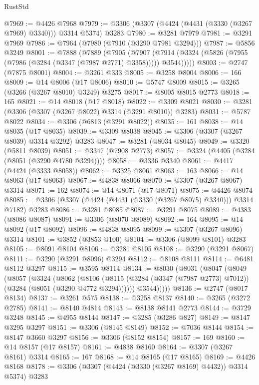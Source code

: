 \begin{lexlean}{RustStd}
\begin{coremodule}
@7969 := @4426 @7968
@7979 := @3306 (@3307 (@4424 (@4431 (@3330 (@3267 @7969) @3340))) @3314 @5374) @3283
@7980 := @3281 @7979
@7981 := @3291 @7969
@7986 := @7964 (@7980 (@7910 (@3290 @7981 @3294)))
@7987 := @5856 @3249
@8001 := @7888
    (@7889
      (@7905
        (@7907 (@7914 (@3324 (@5826 (@7955 (@7986 (@3284 (@3347 (@7987 @2771) @3358))))) @3544)))))
@8003 := @2747 (@7875 @8001)
@8004 := @3261 @333
@8005 := @3258 @8004
@8006 := 166
@8009 := @14 @8006 (@17 @8006)
@8010 := @5747 @8009
@8015 := @3265 (@3266 (@3267 @8010) @3249) @3275
@8017 := @8005 @8015 @2773
@8018 := 165
@8021 := @14 @8018 (@17 @8018)
@8022 := @3309 @8021
@8030 := @3281 (@3306 (@3307 (@3267 @8022) @3314 (@3291 @8010)) @3283)
@8031 := @5787 @8022
@8034 := @3306 (@6813 (@3291 @8022))
@8035 := 161
@8038 := @14 @8035 (@17 @8035)
@8039 := @3309 @8038
@8045 := @3306 (@3307 (@3267 @8039) @3314 @3292) @3283
@8047 := @3281 (@8034 @8045)
@8049 := @3320 (@5811 @8039)
@8051 := @3347 (@7908 @2773)
@8057 := @3324 (@4405 (@3284 (@8051 (@3290 @4780 @3294))))
@8058 := @3336 @3340
@8061 := @4417 (@4424 (@3333 @8058))
@8062 := @3325 @8061
@8063 := 163
@8066 := @14 @8063 (@17 @8063)
@8067 := @4838 @8066
@8070 := @3307 (@3267 @8067) @3314
@8071 := 162
@8074 := @14 @8071 (@17 @8071)
@8075 := @4426 @8074
@8085 := @3306 (@3307 (@4424 (@4431 (@3330 (@3267 @8075) @3340))) @3314 @7182) @3283
@8086 := @3281 @8085
@8087 := @3291 @8075
@8089 := @4383 (@8086 @8087)
@8091 := @3306 (@8070 @8089)
@8092 := 164
@8095 := @14 @8092 (@17 @8092)
@8096 := @4838 @8095
@8099 := @3307 (@3267 @8096) @3314
@8101 := @3852 (@3853 @100)
@8104 := @3306 (@8099 @8101) @3283
@8105 := @8091 @8104
@8106 := @3281 @8105
@8108 := @3290 (@3291 @8067)
@8111 := @3290 (@3291 @8096) @3294
@8112 := @8108 @8111
@8114 := @6481 @8112 @3297
@8115 := @3595 @8114
@8134 := @8030
    (@8031
      (@8047
        (@8049
          (@8057
            (@3324
              (@8062
                (@8106
                  (@8115 (@3284 (@3347 (@7987 @2773) @7012)) (@3284 (@8051 (@3290 @4772 @3294))))))
              @3544)))))
@8136 := @2747 (@8017 @8134)
@8137 := @3261 @575
@8138 := @3258 @8137
@8140 := @3265 (@3272 @2785)
@8141 := @8140 @4814
@8143 := @8138 @8141 @2773
@8144 := @3729 @3248
@8145 := @4955 @8144
@8147 := @3285 (@3286 @827)
@8149 := @8147 @3295 @3297
@8151 := @3306 (@8145 @8149)
@8152 := @7036 @8144
@8154 := @8147 @3660 @3297
@8156 := @3306 (@8152 @8154)
@8157 := 169
@8160 := @14 @8157 (@17 @8157)
@8161 := @4838 @8160
@8164 := @3307 (@3267 @8161) @3314
@8165 := 167
@8168 := @14 @8165 (@17 @8165)
@8169 := @4426 @8168
@8178 := @3306 (@3307 (@4424 (@3330 (@3267 @8169) @4432)) @3314 @5374) @3283

\end{coremodule}
\end{lexlean}
